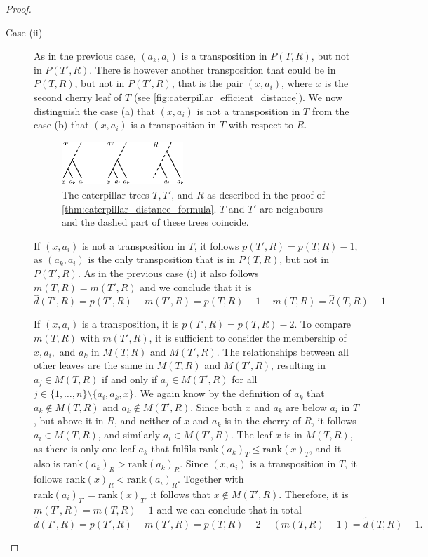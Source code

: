 \documentclass[11pt]{amsart}
\newcommand{\rank}{\mathrm{rank}}
\begin{document}
\begin{proof}
\begin{description}
		\item[Case (ii)]
			As in the previous case, $(a_k,a_i)$ is a transposition in $P(T,R)$, but not in $P(T',R)$.
			There is however another transposition that could be in $P(T,R)$, but not in $P(T',R)$, that is the pair $(x,a_i)$, where $x$ is the second cherry leaf of $T$ (see \autoref{fig:caterpillar_efficient_distance}).
			We now distinguish the case (a) that $(x,a_i)$ is not a transposition in $T$ from the case (b) that $(x,a_i)$ is a transposition in $T$ with respect to $R$.
			\begin{figure}[ht]
				\includegraphics[width=0.45\textwidth]{caterpillar_efficient_distance.eps}
				\caption{The caterpillar trees $T,T'$, and $R$ as described in the proof of \autoref{thm:caterpillar_distance_formula}.
				$T$ and $T'$ are neighbours and the dashed part of these trees coincide.}
				\label{fig:caterpillar_efficient_distance}
			\end{figure}

			If $(x,a_i)$ is not a transposition in $T$, it follows $p(T',R) = p(T,R) - 1$, as $(a_k,a_i)$ is the only transposition that is in $P(T,R)$, but not in $P(T',R)$.
			As in the previous case (i) it also follows $m(T,R) = m(T',R)$ and we conclude that it is
			\[\widehat d(T',R) = p(T',R) - m(T',R) = p(T,R) - 1 - m(T,R) = \widehat d(T,R) - 1\]

			If $(x,a_i)$ is a transposition, it is $p(T',R) = p(T,R) - 2$.
			To compare $m(T,R)$ with $m(T',R)$, it is sufficient to consider the membership of $x,a_i,$ and $a_k$ in $M(T,R)$ and $M(T',R)$.
			The relationships between all other leaves are the same in $M(T,R)$ and $M(T',R)$, resulting in $a_j \in M(T,R)$ if and only if $a_j \in M(T',R)$ for all $j \in \{1, \ldots,n \} \setminus \{a_i, a_k, x\}$.
			We again know by the definition of $a_k$ that $a_k \notin M(T,R)$ and $a_k \notin M(T',R)$.
			Since both $x$ and $a_k$ are below $a_i$ in $T$, but above it in $R$, and neither of $x$ and $a_k$ is in the cherry of $R$, it follows $a_i \in M(T,R)$, and similarly $a_i \in M(T',R)$.
			The leaf $x$ is in $M(T,R)$, as there is only one leaf $a_k$ that fulfils $\rank(a_k)_T \leq \rank(x)_T$, and it also is $\rank(a_k)_R > \rank(a_k)_R$.
			Since $(x,a_i)$ is a transposition in $T$, it follows $\rank(x)_R < \rank(a_i)_R$.
			Together with $\rank(a_i)_{T'} = \rank(x)_{T'}$ it follows that $x \notin M(T',R)$.
			Therefore, it is $m(T',R) = m(T,R) - 1$ and we can conclude that in total
			\[\widehat d(T',R) = p(T',R) - m(T',R) = p(T,R) - 2 - (m(T,R)-1) = \widehat d(T,R) - 1.\]
	\end{description}
\end{proof}
\end{document}
